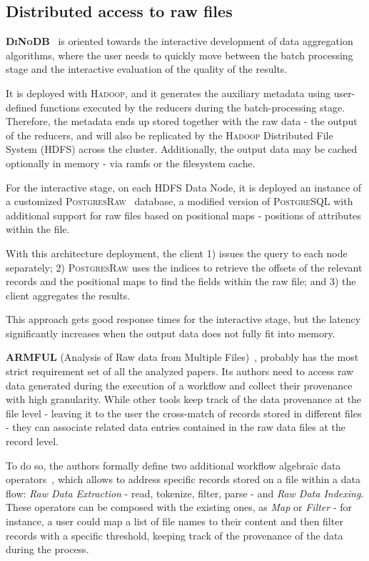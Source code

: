 \subsection{Distributed access to raw files}
\textbf{\textsc{DiNoDB}}~\cite{Tian2014} is oriented towards the interactive development
of data aggregation algorithms, where the user needs to quickly move between 
the batch processing stage and the interactive evaluation of the quality of 
the results.

It is deployed with \textsc{Hadoop}, and it generates the auxiliary metadata 
using user-defined functions executed by the reducers during the batch-processing
stage. Therefore, the metadata ends up stored together with the raw 
data - the output of the reducers, and will also be replicated by the \textsc{Hadoop} 
Distributed File System (\textsc{HDFS}) across the cluster. Additionally, the output 
data may be cached optionally in memory - via ramfs or the filesystem cache.

For the interactive stage, on each HDFS Data Node, it is deployed an 
instance of a customized \textsc{PostgresRaw}~\cite{Alagiannis2012Adaptive}
database, a modified version of \textsc{PostgreSQL} with additional support for 
raw files based on positional maps - positions of attributes within the file.

With this architecture deployment, the client 1) issues the query to each 
node separately; 2) \textsc{PostgresRaw} uses the indices to retrieve the offsets of the 
relevant records and the positional maps to find the fields within the 
raw file; and 3) the client aggregates the results.

This approach gets good response times for the interactive stage,
but the latency significantly increases when the output data does not 
fully fit into memory.

\medskip

\textbf{\textsc{ARMFUL}}  (Analysis of Raw data from Multiple Files)~\cite{Silva2017}, 
probably has the most strict requirement set of all the analyzed papers. Its 
authors need to access raw data generated during the execution of a 
workflow and collect their provenance with high granularity. While other 
tools keep track of the data provenance at the file level - leaving it to the user 
the cross-match of records stored in different files - they can 
associate related data entries contained in the raw data files at the record 
level.

To do so, the authors formally define two additional workflow 
algebraic data operators~\cite{Ogasawara2011}, which allows to address 
specific records stored on a file within a data flow: \emph{Raw Data Extraction} 
- read, tokenize, filter, parse - and \emph{Raw Data Indexing}. These 
operators can be composed with the existing ones, as \emph{Map} or 
\emph{Filter} - for instance, a user could map a list of file names to their 
content and then filter records with a specific threshold, keeping track of 
the provenance of the data during the process.

